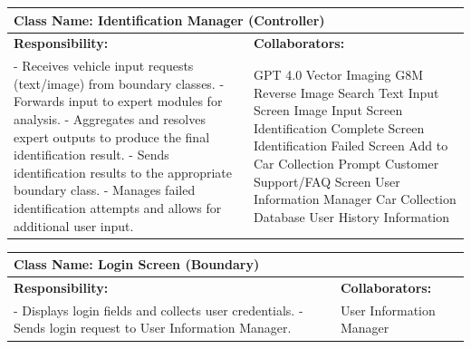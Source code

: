 \documentclass[]{article}
\begin{document}
\begin{table}[ht]
    \centering
    \begin{tabular}{|p{7cm}|p{7cm}|}
    \hline
     \multicolumn{2}{|l|}{\textbf{Class Name: Identification Manager (Controller)}} \\
    \hline
    \textbf{Responsibility:} & \textbf{Collaborators:} \\
    \hline
    - Receives vehicle input requests (text/image) from boundary classes. \newline
    - Forwards input to expert modules for analysis. \newline
    - Aggregates and resolves expert outputs to produce the final identification result. \newline
    - Sends identification results to the appropriate boundary class. \newline
    - Manages failed identification attempts and allows for additional user input.  
    &
    GPT 4.0 \newline
    Vector Imaging \newline
    G8M \newline
    Reverse Image Search \newline
    Text Input Screen \newline
    Image Input Screen \newline
    Identification Complete Screen \newline
    Identification Failed Screen \newline
    Add to Car Collection Prompt \newline
    Customer Support/FAQ Screen \newline
    User Information Manager \newline
    Car Collection Database \newline
    User History Information \\
    \hline
    \end{tabular}
\end{table}

\begin{table}[ht]
    \centering
    \begin{tabular}{|p{7cm}|p{7cm}|}
    \hline
     \multicolumn{2}{|l|}{\textbf{Class Name: Login Screen (Boundary)}} \\
    \hline
    \textbf{Responsibility:} & \textbf{Collaborators:} \\
    \hline
    - Displays login fields and collects user credentials. \newline
    - Sends login request to User Information Manager.
    &
    User Information Manager\\
    \hline
    \end{tabular}
\end{table}
\end{document}
